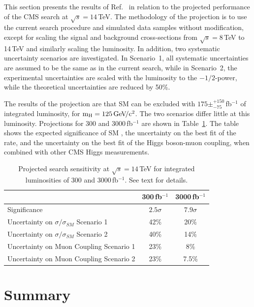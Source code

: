 \documentclass[10pt]{article}
\begin{document}
This section presents the results of Ref.~\cite{CMS:2013xfa} in relation to
the projected performance of the CMS \hmm{} search at $\sqrt{s}=14$\,TeV.
The methodology of the projection is to use the current \hmm{} search
procedure and simulated data samples without modification, except
for scaling the signal and background cross-sections from $\sqrt{s}=8$\,TeV
to 14\,TeV and similarly scaling the luminosity.
In addition, two systematic uncertainty scenarios are investigated.
In Scenario~1, all systematic uncertainties are assumed to be the same
as in the current search, while in Scenario~2, the experimental uncertainties
are scaled with the luminosity to the $-1/2$-power, while the theoretical
uncertainties are reduced by 50\%.

The results of the projection are that SM \hmm{} can be excluded with 
$175\pm^{+150}_{-75}$\,fb$^{-1}$ of integrated luminosity, for $\mathrm{m_H}{}=125\,\mathrm{Ge\kern -0.1em V\!/c^2}{}$.  
The two scenarios differ little at this luminosity.  
Projections for 300 and 3000\,fb$^{-1}$ are shown in Table~\ref{tab:projTab}.  
The table shows the expected significance of SM \hmm{}, the uncertainty
on the best fit of the \hmm{} rate, and the uncertainty on the best fit
of the Higgs boson-muon coupling, when combined with other CMS Higgs measurements.

\begin{table}[t]
\begin{center}
\caption{Projected \hmm search sensitivity at $\sqrt{s}=14$\,TeV for integrated 
            luminosities of 300 and 3000\,fb$^{-1}$.  See text for details.}
\label{tab:projTab}
  \begin{tabular}{lcc} \hline
      & 300\,fb$^{-1}$ & 3000\,fb$^{-1}$ \\ \hline
    Significance  & $2.5\sigma$ & $7.9\sigma$ \\ 
    Uncertainty on $\sigma/\sigma_{SM}$ Scenario 1  & 42\% & 20\% \\ 
    Uncertainty on $\sigma/\sigma_{SM}$ Scenario 2  & 40\% & 14\% \\ 
    Uncertainty on Muon Coupling Scenario 1  & 23\% & 8\% \\ 
    Uncertainty on Muon Coupling Scenario 2  & 23\% & 7.5\% \\ \hline
  \end{tabular}
\end{center}
\end{table}

\section{Summary}
\end{document}
